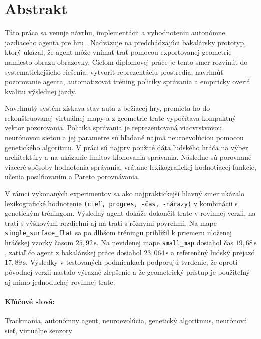 \newpage
\section*{Abstrakt}

Táto práca sa venuje návrhu, implementácii a vyhodnoteniu autonómne jazdiaceho agenta pre hru \Trackmania{}. Nadväzuje na predchádzajúci bakalársky prototyp, ktorý ukázal, že agent môže vnímať trať pomocou exportovanej geometrie namiesto obrazu obrazovky. Cieľom diplomovej práce je tento smer rozvinúť do systematickejšieho riešenia: vytvoriť reprezentáciu prostredia, navrhnúť pozorovanie agenta, automatizovať tréning politiky správania a empiricky overiť kvalitu výslednej jazdy.

Navrhnutý systém získava stav auta z bežiacej hry, premieta ho do rekonštruovanej virtuálnej mapy a z geometrie trate vypočítava kompaktný vektor pozorovania. Politika správania je reprezentovaná viacvrstvovou neurónovou sieťou a jej parametre sú hľadané najmä neuroevolúciou pomocou genetického algoritmu. V práci sú najprv použité dáta ľudského hráča na výber architektúry a na ukázanie limitov klonovania správania. Následne sú porovnané viaceré spôsoby hodnotenia správania, vrátane lexikografickej hodnotiacej funkcie, učenia posilňovaním a Pareto porovnávania.

V rámci vykonaných experimentov sa ako najpraktickejší hlavný smer ukázalo lexikografické hodnotenie \texttt{(cieľ, progres, -čas, -nárazy)} v kombinácii s genetickým tréningom. Výsledný agent dokáže dokončiť trate v rovinnej verzii, na trati s výškovými rozdielmi aj na trati s rôznymi povrchmi. Na mape \texttt{single\_surface\_flat} sa po dlhšom tréningu priblížil k priemeru uloženej hráčskej vzorky časom \(25{,}92\,\mathrm{s}\). Na nevidenej mape \texttt{small\_map} dosiahol čas \(19{,}68\,\mathrm{s}\), zatiaľ čo agent z bakalárskej práce dosiahol \(23{,}064\,\mathrm{s}\) a referenčný ľudský prejazd \(17{,}89\,\mathrm{s}\). Výsledky v testovaných podmienkach podporujú tvrdenie, že oproti pôvodnej verzii nastalo výrazné zlepšenie a že geometrický prístup je použiteľný aj mimo jednoduchej rovinnej trate.

\paragraph*{Kľúčové slová:} Trackmania, autonómny agent, neuroevolúcia, genetický algoritmus, neurónová sieť, virtuálne senzory

